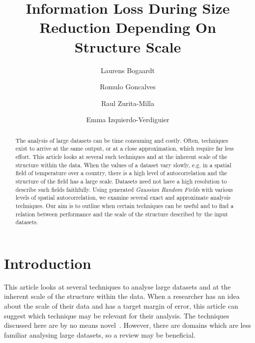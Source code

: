 \documentclass{acm_proc_article-sp}
\begin{document}
\title{\textbf{Information Loss During Size Reduction Depending On Structure Scale}}

\author[1]{Laurens Bogaardt}
\author[1]{Romulo Goncalves}
\author[2]{Raul Zurita-Milla}
\author[2,3]{Emma Izquierdo-Verdiguier}


\date{} %
\maketitle\thispagestyle{empty} %

\begin{abstract}
The analysis of large datasets can be time consuming and costly. Often, techniques exist to arrive at the same output, or at a close approximation, which require far less effort. This article looks at several such techniques and at the inherent scale of the structure within the data. When the values of a dataset vary slowly, e.g. in a spatial field of temperature over a country, there is a high level of autocorrelation and the structure of the field has a large scale. Datasets need not have a high resolution to describe such fields faithfully. Using generated \textit{Gaussian Random Fields} with various levels of spatial autocorrelation, we examine several exact and approximate analysis techniques. Our aim is to outline when certain techniques can be useful and to find a relation between performance and the scale of the structure described by the input datasets.
\end{abstract}

\section{Introduction}
\label{sec:Introduction}

This article looks at several techniques to analyse large datasets and at the inherent scale of the structure within the data. When a researcher has an idea about the scale of their data and has a target margin of error, this article can suggest which technique may be relevant for their analysis. The techniques discussed here are by no means novel~\cite{Golub1970, Bjorck1973, Chan1982, Tygert2017}. However, there are domains which are less familiar analysing large datasets, so a review may be beneficial.
\end{document}
